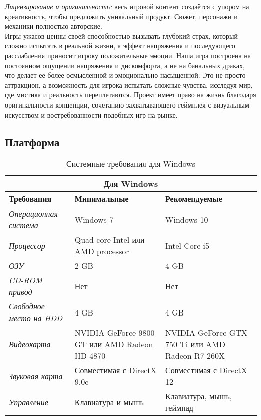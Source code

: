 \documentclass{article}
\begin{document}
	\textit{Лицензирование и оригинальность:} весь игровой контент создаётся с упором на креативность, чтобы предложить уникальный продукт. Сюжет, персонажи и механики полностью авторские. \\
	
	Игры ужасов ценны своей способностью вызывать глубокий страх, который сложно испытать в реальной жизни, а эффект напряжения и последующего расслабления приносит игроку положительные эмоции. Наша игра построена на постоянном ощущении напряжения и дискомфорта, а не на банальных драках, что делает ее более осмысленной и эмоционально насыщенной. Это не просто аттракцион, а возможность для игрока испытать сложные чувства, исследуя мир, где мистика и реальность переплетаются. Проект имеет право на жизнь благодаря оригинальности концепции, сочетанию захватывающего геймплея с визуальным искусством и востребованности подобных игр на рынке.

	\newpage
	\subsection{Платформа}
	
	\begin{table}[h!]
		\centering
		\renewcommand{\arraystretch}{1.5}
		\setlength{\tabcolsep}{8pt}
		\begin{tabular}{|p{}|p{}|p{}|}
			\hline
			\multicolumn{3}{|c|}{\textbf{Для Windows}} \\ \hline
			\textbf{Требования} & \textbf{Минимальные} & \textbf{Рекомендуемые} \\ \hline
			\textit{Операционная система} & Windows 7 & Windows 10 \\ \hline
			\textit{Процессор} & Quad-core Intel \newline или AMD processor & Intel Core i5 \\ \hline
			\textit{ОЗУ} & 2 GB & 4 GB \\ \hline
			\textit{CD-ROM привод} & Нет & Нет \\ \hline
			\textit{Свободное место на HDD} & 4 GB & 4 GB \\ \hline
			\textit{Видеокарта} & NVIDIA GeForce 9800 GT \newline или AMD Radeon HD 4870 & NVIDIA GeForce GTX 750 Ti \newline или AMD Radeon R7 260X \\ \hline
			\textit{Звуковая карта} & Совместимая с DirectX 9.0c & Совместимая с DirectX 12 \\ \hline
			\textit{Управление} & Клавиатура и мышь & Клавиатура, мышь, геймпад \\ \hline
		\end{tabular}
		\caption{Системные требования для Windows}
		\label{tab:system-requirements1}
	\end{table}
	
\end{document}
